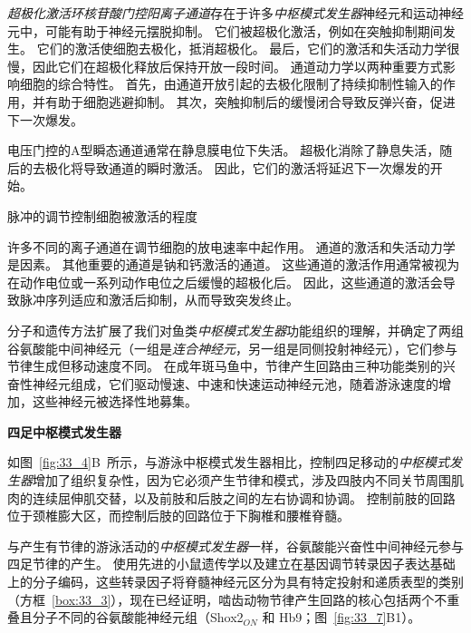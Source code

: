 \begin{proposition}[神经元离子通道有助于中枢模式发生器功能]
	\quad \quad \textit{超极化激活环核苷酸门控阳离子通道}存在于许多\textit{中枢模式发生器}神经元和运动神经元中，可能有助于神经元摆脱抑制。
	它们被超极化激活，例如在突触抑制期间发生。
	它们的激活使细胞去极化，抵消超极化。
	最后，它们的激活和失活动力学很慢，因此它们在超极化释放后保持开放一段时间。
	通道动力学以两种重要方式影响细胞的综合特性。
	首先，由通道开放引起的去极化限制了持续抑制性输入的作用，并有助于细胞逃避抑制。
	其次，突触抑制后的缓慢闭合导致反弹兴奋，促进下一次爆发。
	
	\quad \quad 电压门控的A型瞬态通道通常在静息膜电位下失活。
	超极化消除了静息失活，随后的去极化将导致通道的瞬时激活。
	因此，它们的激活将延迟下一次爆发的开始。
	
	\quad \quad 脉冲的调节控制细胞被激活的程度
	
	\quad \quad 许多不同的离子通道在调节细胞的放电速率中起作用。
	通道的激活和失活动力学是因素。
	其他重要的通道是钠和钙激活的通道。
	这些通道的激活作用通常被视为在动作电位或一系列动作电位之后缓慢的超极化后。
	因此，这些通道的激活会导致脉冲序列适应和激活后抑制，从而导致突发终止。
	
\end{proposition}


分子和遗传方法扩展了我们对鱼类\textit{中枢模式发生器}功能组织的理解，并确定了两组谷氨酸能中间神经元（一组是\textit{连合神经元}，另一组是同侧投射神经元），它们参与节律生成但移动速度不同。
在成年斑马鱼中，节律产生回路由三种功能类别的兴奋性神经元组成，它们驱动慢速、中速和快速运动神经元池，随着游泳速度的增加，这些神经元被选择性地募集。


\textbf{四足中枢模式发生器}

如图~\ref{fig:33_4}B~所示，与游泳中枢模式发生器相比，控制四足移动的\textit{中枢模式发生器}增加了组织复杂性，因为它必须产生节律和模式，涉及四肢内不同关节周围肌肉的连续屈伸肌交替，以及前肢和后肢之间的左右协调和协调。
控制前肢的回路位于颈椎膨大区，而控制后肢的回路位于下胸椎和腰椎脊髓。


与产生有节律的游泳活动的\textit{中枢模式发生器}一样，谷氨酸能兴奋性中间神经元参与四足节律的产生。
使用先进的小鼠遗传学以及建立在基因调节转录因子表达基础上的分子编码，这些转录因子将脊髓神经元区分为具有特定投射和递质表型的类别（方框~\ref{box:33_3}），现在已经证明，啮齿动物节律产生回路的核心包括两个不重叠且分子不同的谷氨酸能神经元组（Shox2$_{ON} $ 和 Hb9；图~\ref{fig:33_7}B1）。



